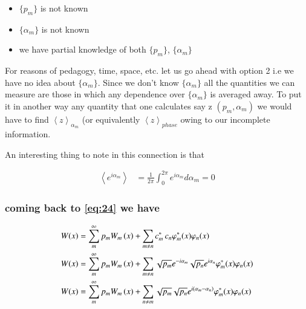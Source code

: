 \begin{itemize}
\item $\lbrace{{p}_{m}}\rbrace$ is not known 
\item $\lbrace{\alpha}_{m}\rbrace$ is not known
\item we have partial knowledge of both $\lbrace{{p}_{m}}\rbrace$,  $\lbrace{\alpha}_{m}\rbrace$
\end{itemize}
\par
For reasons of pedagogy, time, space, etc. let us go ahead with option 2 i.e  we have no idea about $\lbrace{\alpha}_{m}\rbrace$. Since we don't know $\lbrace{\alpha}_{m}\rbrace$ all the quantities we can measure are those in which any dependence over $\lbrace{\alpha}_{m}\rbrace$ is averaged away. To put it in another way any quantity that one calculates say z $({p}_{m}, {\alpha}_{m})$ we would have to find  ${\left\langle{z}\right\rangle}_{\alpha_{m}}$ (or equivalently ${\left\langle{z}\right\rangle}_{phase}$ owing to our incomplete information.

An interesting thing to note in this connection is that 


\begin{align}\label{eq:28}
\left\langle{ e }^{ i{ \alpha  }_{ m } }\right\rangle &=\frac { 1 }{ 2\pi  } \int _{ 0 }^{ 2\pi  }{ { e }^{ i{ \alpha  }_{ m } } } { d }{ \alpha  }_{ m } =0
\end{align}



\subsubsection{coming back to \eqref{eq:24} we have}
\begin{align}\label{eq:29}
W{(x)}&=\sum _{ m }^{\infty  }{ { p }_{m}}{W}_{ m }\left( x \right)+\sum _{ m\neq{n}} c_{m}^{*}\thinspace c_{n}{ \varphi  }_{ m }^{ * }(x){ \varphi  }_{ n }(x)\notag\\
W{(x)}&=\sum _{ m }^{\infty  }{ { p }_{m}}{W}_{ m }\left( x \right)+\sum _{ m\neq{n}}\sqrt{{p}_{m}} e^{-i{\alpha}_{m}} \sqrt{{p}_{n}} e^{i{\alpha}_{n}} { \varphi  }_{ m }^{ * }(x){ \varphi  }_{ n }(x)\notag\\
W{(x)}&=\sum _{ m }^{\infty  }{ { p }_{m}}{W}_{ m }\left( x \right)+\sum _{ n\neq m }^{  }{ \sqrt { { p }_{ m } }  } \sqrt{{p}_{n}} { e }^{ i({ \alpha  }_{ m }-{ \alpha  }_{ n }) }{ \varphi  }_{ m }^{ * }(x){ \varphi  }_{ n }(x)
\end{align}

